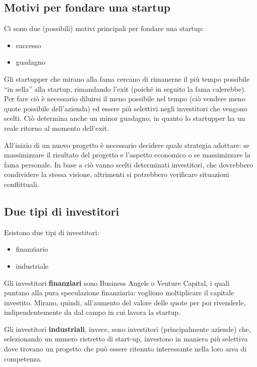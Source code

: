 \subsection{Motivi per fondare una startup}
Ci sono due (possibili) motivi principali per fondare una startup:
\begin{itemize}
 \item successo
 \item guadagno
\end{itemize}

Gli startupper che mirano alla fama cercano di rimanerne il più tempo possibile
``in sella'' alla startup, rimandando l'exit (poiché in seguito la fama
calerebbe). Per fare ciò è necessario diluirsi il meno possibile nel tempo (ciò
vendere meno quote possibile dell'azienda) ed essere più selettivi negli
investitori che vengono scelti. Ciò determina anche un minor guadagno, in
quanto lo startupper ha un reale ritorno al momento dell'exit.

All'inizio di un nuovo progetto è necessario decidere quale strategia adottare:
se massimizzare il risultato del progetto e l'aspetto economico o se
massimizzare la fama personale. In base a ciò vanno scelti determinati
investitori, che dovrebbero condividere la stessa visione, altrimenti si
potrebbero verificare situazioni conflittuali.

\subsection{Due tipi di investitori}

Esistono due tipi di investitori:
\begin{itemize}
 \item finanziario
 \item industriale
\end{itemize}

Gli investitori \textbf{finanziari} sono Business Angels o Venture Capital, i
quali puntano alla pura speculazione finanziaria: vogliono moltiplicare il
capitale investito. Mirano, quindi, all'aumento del valore delle quote per poi
rivenderle, indipendentemente da dal campo in cui lavora la startup. 

Gli investitori \textbf{industriali}, invece, sono investitori (principalmente
aziende) che, selezionando un numero ristretto di start-up, investono in
maniera più selettiva dove trovano un progetto che può essere ritenuto
interessante nella loro area di competenza.

